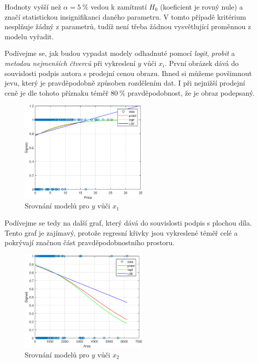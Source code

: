 Hodnoty vyšší než \( \alpha = 5 \: \% \) vedou k zamítnutí \( H_0 \) (koeficient je rovný nule) a značí statistickou insignifikanci daného parametru.
V tomto případě kritérium nesplňuje žádný z parametrů, tudíž není třeba žádnou vysvětlující proměnnou z modelu vyřadit.

Podívejme se, jak budou vypadat modely odhadnuté pomocí \textit{logit}, \textit{probit} a \textit{metodou nejmenších čtverců} při vykreslení \( y \) vůči \( x_i \).
První obrázek dává do souvislosti podpis autora s prodejní cenou obrazu.
Ihned si můžeme povšimnout jevu, který je pravděpodobně způsoben rozdělením dat.
I při nejnižší prodejní ceně je dle tohoto příznaku téměř \( 80 \: \% \) pravděpodobnost, že je obraz podepsaný.

\begin{figure}[htb]
    \centering
    \includegraphics[width=0.55\textwidth]{graphs/fig2.eps}
    \caption{Srovnání modelů pro \( y \) vůči \( x_1 \)}
    \label{fig:lr2}
\end{figure}
\FloatBarrier

Podívejme se tedy na další graf, který dává do souvislosti podpis s plochou díla.
Tento graf je zajímavý, protože regresní křivky jsou vykreslené téměř celé a pokrývají značnou část pravděpodobnostního prostoru.

\begin{figure}[htb]
    \centering
    \includegraphics[width=0.55\textwidth]{graphs/fig3.eps}
    \caption{Srovnání modelů pro \( y \) vůči \( x_2 \)}
    \label{fig:lr3}
\end{figure}
\FloatBarrier


